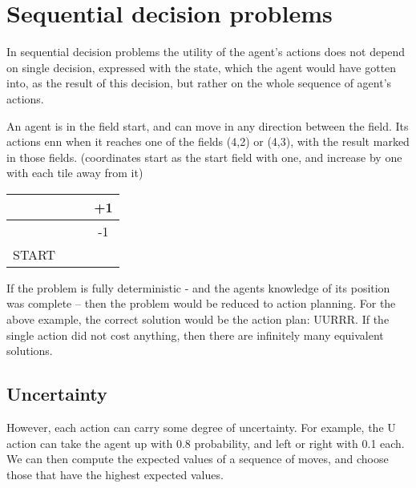 
\chapter{Sequential decision problems}
In sequential decision problems the utility of the agent's actions does not depend on single decision, expressed with the state, which the agent would have gotten into, as the result of this decision, but rather on the whole sequence of agent's actions.
\ex{}
{
    An agent is in the field start, and can move in any direction between the field. Its actions enn when it reaches one of the fields (4,2) or (4,3), with the result marked in those fields. (coordinates start as the start field with one, and increase by one with each tile away from it)
    \begin{center}
    \begin{tabular}{|c|c|c|c|}
    \hline
        &  &  & +1\\
    \hline
        &  &  & -1\\
    \hline
        \tiny{START}   &  &  & \\
    \hline
    \end{tabular}
    \end{center}
}
If the problem is fully deterministic - and the agents knowledge of its position was complete -- then the problem would be reduced to action planning. For the above example, the correct solution would be the action plan: UURRR. If the single action did not cost anything, then there are infinitely many equivalent solutions.

\section{Uncertainty}
However, each action can carry some degree of uncertainty. For example, the U action can take the agent up with 0.8 probability, and left or right with 0.1 each.
We can then compute the expected values of a sequence of moves, and choose those that have the highest expected values.
